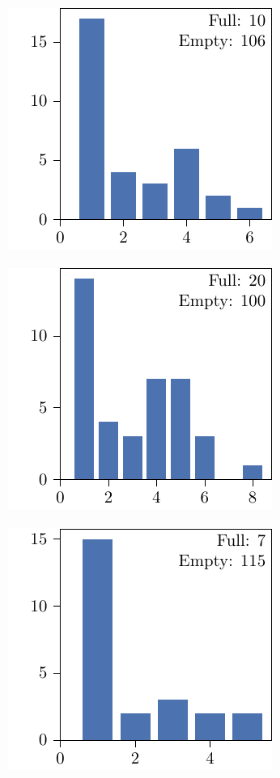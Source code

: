 \begin{figure}[p]
  \centering
  \begin{subfigure}{\textwidth}
    \centering
    \begin{subfigure}{\mymultiouter}
        \includegraphics[width=\mymultiinner]{figures/new/abs_common-wine-qlibra-permutation}
    \end{subfigure}
    \begin{subfigure}{\mymultiouter}
        \includegraphics[width=\mymultiinner]{figures/new/abs_common-wine-qlibra-retraining}
    \end{subfigure}
    \begin{subfigure}{\mymultiouter}
        \includegraphics[width=\mymultiinner]{figures/new/abs_common-wine-permutation-retraining}

\end{subfigure}
\end{subfigure}
\end{figure}
